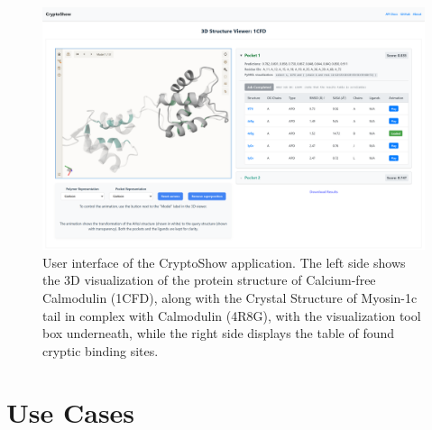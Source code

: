 \begin{figure}[htbp]
    \centering
    \includegraphics[width=\textwidth]{img/ui.png}
    \caption{User interface of the CryptoShow application. The left side shows the 3D visualization of the protein structure of Calcium-free Calmodulin (1CFD), along with the Crystal Structure of Myosin-1c tail in complex with Calmodulin (4R8G), with the visualization tool box underneath, while the right side displays the table of found cryptic binding sites.}
    \label{fig:ui}
\end{figure}

\section{Use Cases}
\label{sec:use-cases}

